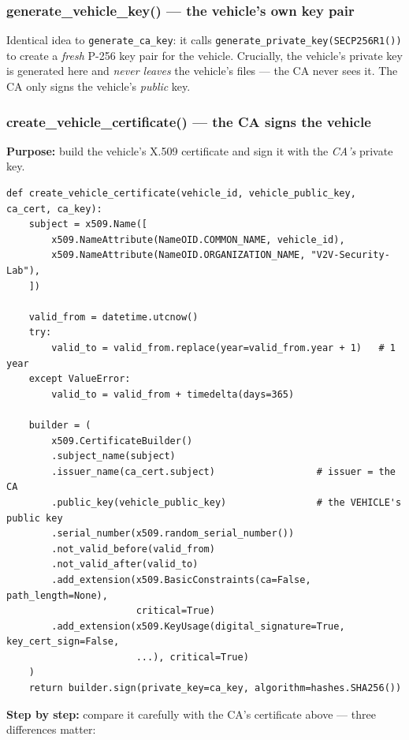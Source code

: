 \documentclass[11pt,a4paper]{article}
\begin{document}
\subsubsection*{generate\_vehicle\_key() --- the vehicle's own key pair}
Identical idea to \texttt{generate\_ca\_key}: it calls
\texttt{generate\_private\_key(SECP256R1())} to create a \emph{fresh} P-256 key
pair for the vehicle. Crucially, the vehicle's private key is generated here and
\emph{never leaves} the vehicle's files --- the CA never sees it. The CA only
signs the vehicle's \emph{public} key.

\subsubsection*{create\_vehicle\_certificate() --- the CA signs the vehicle}
\textbf{Purpose:} build the vehicle's X.509 certificate and sign it with the
\emph{CA's} private key.
\begin{lstlisting}[style=py,caption={ca/issue\_cert.py --- build and CA-sign a vehicle certificate.}]
def create_vehicle_certificate(vehicle_id, vehicle_public_key, ca_cert, ca_key):
    subject = x509.Name([
        x509.NameAttribute(NameOID.COMMON_NAME, vehicle_id),
        x509.NameAttribute(NameOID.ORGANIZATION_NAME, "V2V-Security-Lab"),
    ])

    valid_from = datetime.utcnow()
    try:
        valid_to = valid_from.replace(year=valid_from.year + 1)   # 1 year
    except ValueError:
        valid_to = valid_from + timedelta(days=365)

    builder = (
        x509.CertificateBuilder()
        .subject_name(subject)
        .issuer_name(ca_cert.subject)                  # issuer = the CA
        .public_key(vehicle_public_key)                # the VEHICLE's public key
        .serial_number(x509.random_serial_number())
        .not_valid_before(valid_from)
        .not_valid_after(valid_to)
        .add_extension(x509.BasicConstraints(ca=False, path_length=None),
                       critical=True)
        .add_extension(x509.KeyUsage(digital_signature=True, key_cert_sign=False,
                       ...), critical=True)
    )
    return builder.sign(private_key=ca_key, algorithm=hashes.SHA256())
\end{lstlisting}
\textbf{Step by step:} compare it carefully with the CA's certificate above ---
three differences matter:
\end{document}
